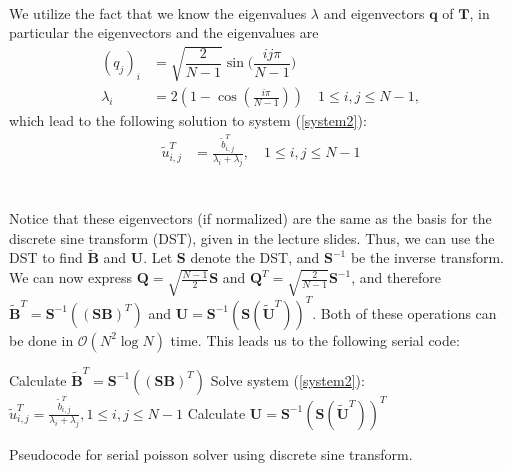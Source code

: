 \\
We utilize the fact that we know the eigenvalues $\lambda$ and eigenvectors $\mathbf{q}$ of $\mathbf{T}$, in particular the eigenvectors and the eigenvalues are
\begin{align*}
	(q_j)_i &= \sqrt{\dfrac{2}{N-1}}\sin \Big( \dfrac{ij\pi}{N-1}\Big) \\
	\lambda_i &= 2\left(1-\cos\left(\frac{i \pi}{N-1}\right) \right)\quad 1 \leq i, j \leq N-1,
\end{align*}
which lead to the following solution to system (\ref{system2}):
\begin{align*}
\tilde{u}^T_{i,j} &= \frac{\tilde{b}^T_{i,j}}{\lambda_i + \lambda_j},\quad 1 \leq i, j \leq N-1
\end{align*}
\\ \\
Notice that these eigenvectors (if normalized) are the same as the basis for the discrete sine transform (DST), given in the lecture slides. \cite{forelesning} Thus, we can use the DST to find $\mathbf{\widetilde{B}}$ and $\mathbf{U}$. Let $\mathbf{S}$ denote the DST, and $\mathbf{S}^{-1}$ be the inverse transform. We can now express $\mathbf{Q} = \sqrt{\frac{N-1}{2}}\mathbf{S}$ and $\mathbf{Q}^T = \sqrt{\frac{2}{N-1}}\mathbf{S}^{-1}$, and therefore $\mathbf{\widetilde{B}}^T = \mathbf{S}^{-1}((\mathbf{SB})^T)$ and $\mathbf{U} = \mathbf{S}^{-1}(\mathbf{S}(\mathbf{\widetilde{U}}^T))^T$. Both of these operations can be done in $\mathcal{O}(N^2\log{N})$ time. 
This leads us to the following serial code:\\

\begin{algorithm}[H]
 Calculate $\mathbf{\widetilde{B}}^T = \mathbf{S}^{-1}((\mathbf{SB})^T)$  \;
 Solve system (\ref{system2}): $\tilde{u}^T_{i,j} = \frac{\tilde{b}^T_{i,j}}{\lambda_i + \lambda_j}, 1 \leq i, j \leq N-1$\;
 Calculate $\mathbf{U} = \mathbf{S}^{-1}(\mathbf{S}(\mathbf{\widetilde{U}}^T))^T$ \;
 \caption{Pseudocode for serial poisson solver using discrete sine transform.}
 \label{code:serial}
\end{algorithm}